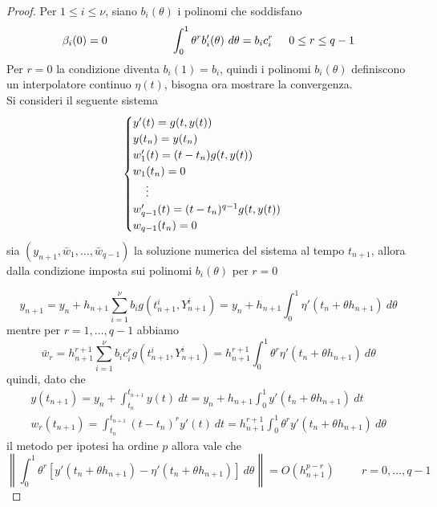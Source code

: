 \begin{proof}
Per $1 \le i \le \nu$, siano $b_i(\theta)$ i polinomi che soddisfano
$$
 \displaystyle
 \beta_i(0)=0
  \hspace{2cm}
 \displaystyle
 \int_0^1 \theta^r b_i'(\theta) \ d \theta = b_i c_i^r
 \hspace{0.5cm} 		0 \le r \le q-1
$$
Per $r=0$ la condizione diventa $b_i(1)=b_i$, quindi i polinomi $b_i(\theta)$ definiscono 
un interpolatore continuo $\eta(t)$, bisogna ora mostrare la convergenza.\\
Si consideri il seguente sistema
$$
\begin{cases}
  y'(t) = g(t,y (t)) 			\\
  y(t_n) = y(t_n)			\\
  w_1'(t)=(t-t_n) g(t,y(t))		\\
  w_1(t_n)=0				\\
  \hspace{0.4cm}    \vdots		\\
  w_{q-1}'(t)=(t-t_n)^{q-1} g(t,y(t))	\\
  w_{q-1}(t_n)=0
\end{cases}
$$
sia
$
(y_{n+1}, \bar{w}_1 , \dots , \bar{w}_{q-1})
$
la soluzione numerica del sistema al tempo $t_{n+1}$, allora dalla condizione imposta sui polinomi 
$b_i(\theta)$ per $r=0$

$$
y_{n+1}=y_n + h_{n+1} \sum_{i=1}^{\nu} b_i g(t_{n+1}^i,Y_{n+1}^i) = 
y_n + h_{n+1} \int_0^1 \eta'(t_n + \theta h_{n+1}) \ d \theta
$$
mentre per $r=1, \dots , q-1$ abbiamo
$$
\bar{w}_r = h_{n+1}^{r+1} \sum_{i=1}^{\nu} b_i c_i^r g(t_{n+1}^i,Y_{n+1}^i) = 
h_{n+1}^{r+1} \int_0^1 \theta^r \eta'(t_n + \theta h_{n+1}) \ d \theta
$$
quindi, dato che
$$
\begin{array}{lc}
\displaystyle
y(t_{n+1}) = y_n + \int_{t_n}^{t_{n+1}} y(t) \ dt 		= 
y_n + h_{n+1} \int_0^1 y'(t_n + \theta h_{n+1}) \ dt		\\
\displaystyle
w_r(t_{n+1}) = \int_{t_n}^{t_{n+1}} (t-t_n)^r y'(t) \ dt = 
h_{n+1}^{r+1} \int_0^1 \theta^r y'(t_n + \theta h_{n+1}) \ d \theta
\end{array}
$$
il metodo per ipotesi ha ordine $p$ allora vale che
\begin{equation}
\left \| 
\int_0^1 \theta^r 
[ y'(t_n + \theta h_{n+1}) - \eta'(t_n + \theta h_{n+1})] \ d \theta
\right \|
= O(h_{n+1}^{p-r})
\hspace{1cm}
r=0, \dots, q-1 
\end{equation}


\end{proof}
